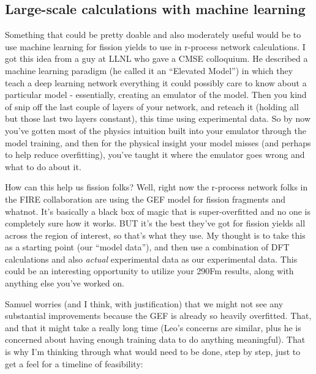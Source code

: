 \subsection{Large-scale calculations with machine learning}
Something that could be pretty doable and also moderately useful would be to use machine learning for fission yields to use in r-process network calculations. I got this idea from a guy at LLNL who gave a CMSE colloquium. He described a machine learning paradigm (he called it an ``Elevated Model'') in which they teach a deep learning network everything it could possibly care to know about a particular model - essentially, creating an emulator of the model. Then you kind of snip off the last couple of layers of your network, and reteach it (holding all but those last two layers constant), this time using experimental data. So by now you've gotten most of the physics intuition built into your emulator through the model training, and then for the physical insight your model misses (and perhaps to help reduce overfitting), you've taught it where the emulator goes wrong and what to do about it.

How can this help us fission folks? Well, right now the r-process network folks in the FIRE collaboration are using the GEF model for fission fragments and whatnot. It's basically a black box of magic that is super-overfitted and no one is completely sure how it works. BUT it's the best they've got for fission yields all across the region of interest, so that's what they use. My thought is to take this as a starting point (our ``model data''), and then use a combination of DFT calculations and also \textit{actual} experimental data as our experimental data. This could be an interesting opportunity to utilize your 290Fm results, along with anything else you've worked on.

Samuel worries (and I think, with justification) that we might not see any substantial improvements because the GEF is already so heavily overfitted. That, and that it might take a really long time (Leo's concerns are similar, plus he is concerned about having enough training data to do anything meaningful). That is why I'm thinking through what would need to be done, step by step, just to get a feel for a timeline of feasibility:

